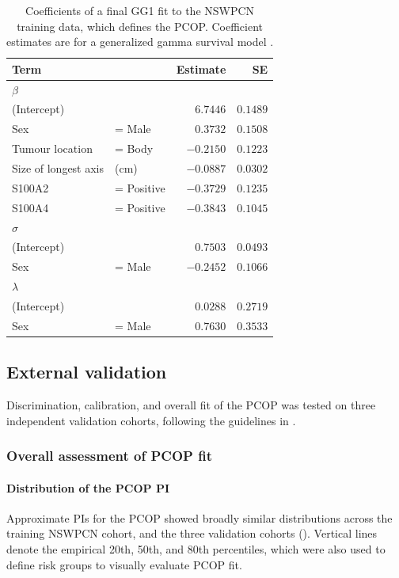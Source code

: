 \documentclass[dissertation.tex]{subfiles}
\begin{document}
\begin{table}
\centering
\caption[Final PCOP fit]{Coefficients of a final GG1 fit to the \gls{NSWPCN} training data, which defines the \gls{PCOP}.  Coefficient estimates are for a generalized gamma survival model \cite{Cox2007}.}\label{tab:nomo-final-fit}
\begin{tabular}{llrr}
\toprule
Term                   &                & Estimate       & SE       \\ \midrule
$\beta$ \\
(Intercept)            &                &  $6.7446$      & $0.1489$ \\
Sex                    & = Male         &  $0.3732$      & $0.1508$ \\
Tumour location        & = Body         & $-0.2150$      & $0.1223$ \\
Size of longest axis   &  (cm)          & $-0.0887$      & $0.0302$ \\
S100A2                 & = Positive     & $-0.3729$      & $0.1235$ \\
S100A4                 & = Positive     & $-0.3843$      & $0.1045$ \\[10]
$\sigma$ \\
(Intercept)            &                &  $0.7503$      & $0.0493$ \\
Sex                    & = Male         & $-0.2452$      & $0.1066$ \\[10]
$\lambda$ \\
(Intercept)            &                &  $0.0288$      & $0.2719$ \\
Sex                    & = Male         &  $0.7630$      & $0.3533$ \\[5] \bottomrule
\end{tabular}
\end{table}


\subsection{External validation}
Discrimination, calibration, and overall fit of the \gls{PCOP} was tested on three independent validation cohorts, following the guidelines in \cite{Royston2013}.

\subsubsection{Overall assessment of \acrshort{PCOP} fit}
\paragraph{Distribution of the \acrshort{PCOP} \acrshort{PI}}
Approximate \glspl{PI} for the \gls{PCOP} showed broadly similar distributions across the training \gls{NSWPCN} cohort, and the three validation cohorts ().  Vertical lines denote the empirical 20th, 50th, and 80th percentiles, which were also used to define risk groups to visually evaluate \gls{PCOP} fit.
\end{document}
